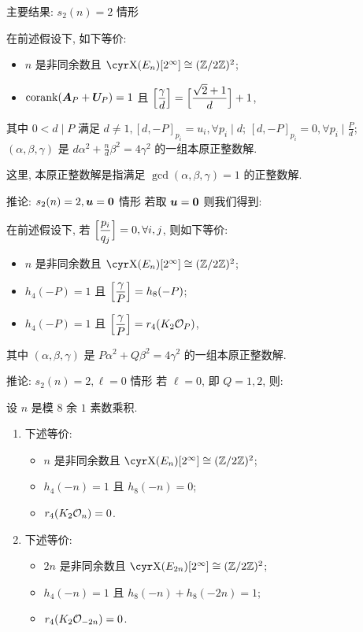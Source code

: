 \documentclass[handout,aspectratio=169]{ctexbeamer}
\renewcommand\aleg[2]{\Bigl[\dfrac{{#1}}{#2}\Bigr]}
\begin{document}
\begin{frame}{主要结果: $s_2(n)=2$ 情形}
	\onslide<+->
	\begin{theorem}
		在前述假设下, 如下等价:
		\begin{itemize}[<*>]
			\item $n$ 是非同余数且 $\Sha(E_n)[2^\infty]\cong(\BZ/2\BZ)^2$;
			\item $\operatorname{corank}({\boldsymbol{A}}_P+{\boldsymbol{U}}_P)=1$ 且 $\aleg{\gamma}d=\aleg{\sqrt2+1}{d}+1$,
		\end{itemize}
		其中 $0<d\mid P$ 满足 $d\ne 1, [d,-P]_{p_i}=u_i,\forall p_i\mid d$; $[d,-P]_{p_i}=0,\forall p_i\mid \frac Pd$;  $(\alpha,\beta,\gamma)$ 是 $d\alpha^2+\frac{n}d\beta^2=4\gamma^2$ 的一组本原正整数解.
	\end{theorem}
	\onslide<+->
	这里, 本原正整数解是指满足 $\gcd(\alpha,\beta,\gamma)=1$ 的正整数解.
\end{frame}


\begin{frame}{推论: $s_2(n)=2,{\boldsymbol{u}}={\bf0}$ 情形}
	\onslide<+->
	若取 ${\boldsymbol{u}}={\bf0}$ 则我们得到:
	\onslide<+->
	\begin{corollary}
		在前述假设下, 若 $\aleg{p_i}{q_j}=0, \forall i,j$, 则如下等价:
		\begin{itemize}[<*>]
			\item $n$ 是非同余数且 $\Sha(E_n)[2^\infty]\cong(\BZ/2\BZ)^2$;
			\item $h_4(-P)=1$ 且 $\aleg{\gamma}P=h_8(-P)$;
			\item $h_4(-P)=1$ 且 $\aleg{\gamma}P=r_4(K_2\CO_P)$,
		\end{itemize}
		其中 $(\alpha,\beta,\gamma)$ 是 $P\alpha^2+Q\beta^2=4\gamma^2$ 的一组本原正整数解.
	\end{corollary}
\end{frame}


\begin{frame}{推论: $s_2(n)=2,\ell=0$ 情形}
	\onslide<+->
	若 $\ell=0$, 即 $Q=1,2$, 则:
	\onslide<+->
	\begin{corollary}
		设 $n$ 是模 $8$ 余 $1$ 素数乘积.
		\begin{enumerate}
			\item 下述等价:
			\begin{itemize}[<*>]
				\item $n$ 是非同余数且 $\Sha(E_n)[2^\infty]\cong(\BZ/2\BZ)^2$;
				\item $h_4(-n)=1$ 且 $h_8(-n)=0$;
				\item $r_4(K_2{\mathcal{O}}_n)=0$.
			\end{itemize}
			\item 下述等价:
			\begin{itemize}[<*>]
				\item $2n$ 是非同余数且 $\Sha(E_{2n})[2^\infty]\cong(\BZ/2\BZ)^2$;
				\item $h_4(-n)=1$ 且 $h_8(-n)+h_8(-2n)=1$;
				\item $r_4(K_2{\mathcal{O}}_{-2n})=0$.
			\end{itemize}
		\end{enumerate}
	\end{corollary}
\end{frame}
\end{document}
